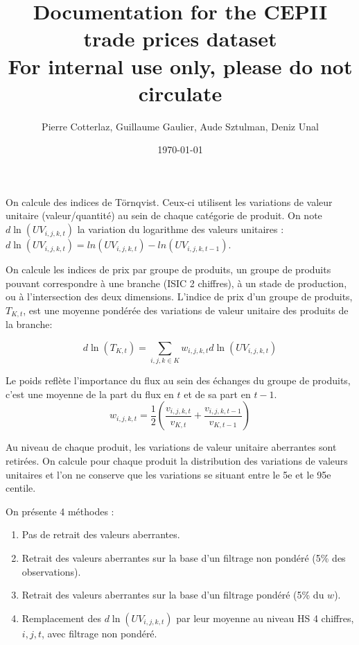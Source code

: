 \documentclass[12pt]{article}
\title{Documentation for the CEPII trade prices dataset \\
\small{For internal use only, please do not circulate}}
\author{Pierre Cotterlaz, Guillaume Gaulier, Aude Sztulman, Deniz Unal}
\date{\today}
\begin{document}
\maketitle

On calcule des indices de Törnqvist. Ceux-ci utilisent les variations de valeur unitaire (valeur/quantité) au sein de chaque catégorie de produit. On note $d\ln(UV_{i,j,k,t})$ la variation du logarithme des valeurs unitaires : $d\ln(UV_{i,j,k,t}) = ln(UV_{i,j,k,t}) - ln(UV_{i,j,k,t-1})$. 

On calcule les indices de prix par groupe de produits, un groupe de produits pouvant correspondre à une branche (ISIC 2 chiffres), à un stade de production, ou à l'intersection des deux dimensions. L'indice de prix d'un groupe de produits, $T_{K,t}$, est une moyenne pondérée des variations de valeur unitaire des produits de la branche: 

\begin{equation*}
    d\ln(T_{K,t}) = \sum_{i,j,k \in K} w_{i,j,k,t} d\ln(UV_{i,j,k,t})
\end{equation*}

Le poids reflète l'importance du flux au sein des échanges du groupe de produits, c'est une moyenne de la part du flux en $t$ et de sa part en $t-1$. 
$$w_{i,j,k,t} = \frac{1}{2} \left( \frac{v_{i,j,k,t}}{v_{K,t}} + \frac{v_{i,j,k,t-1}}{v_{K,t-1}}  \right)$$

Au niveau de chaque produit, les variations de valeur unitaire aberrantes sont retirées. On calcule pour chaque produit la distribution des variations de valeurs unitaires et l'on ne conserve que les variations se situant entre le 5e et le 95e centile.

On présente 4 méthodes : 

\begin{enumerate}
\item Pas de retrait des valeurs aberrantes.
\item Retrait des valeurs aberrantes sur la base d'un filtrage non pondéré (5\% des observations).
\item Retrait des valeurs aberrantes sur la base d'un filtrage pondéré (5\% du $w$).
\item Remplacement des $d\ln(UV_{i,j,k,t})$ par leur moyenne au niveau HS 4 chiffres, $i,j,t$, avec filtrage non pondéré. 
\end{enumerate}
\end{document}
